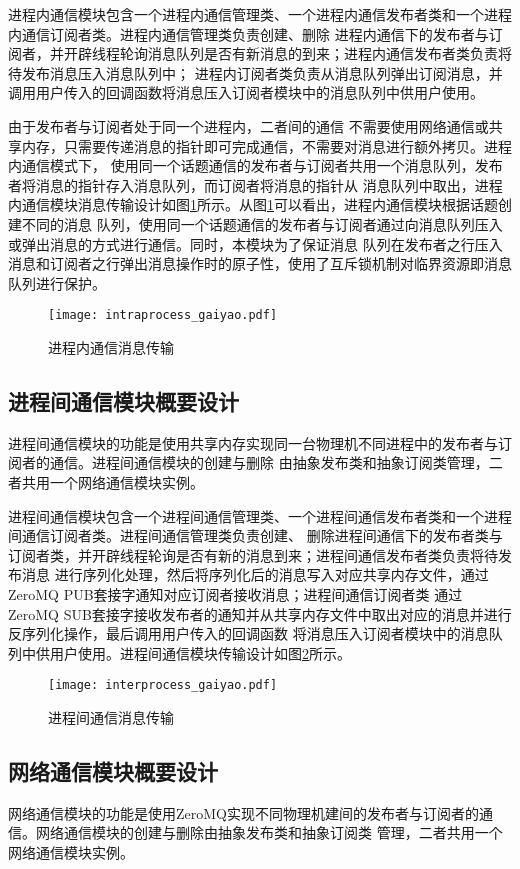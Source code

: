 进程内通信模块包含一个进程内通信管理类、一个进程内通信发布者类和一个进程内通信订阅者类。进程内通信管理类负责创建、删除
进程内通信下的发布者与订阅者，并开辟线程轮询消息队列是否有新消息的到来；进程内通信发布者类负责将待发布消息压入消息队列中；
进程内订阅者类负责从消息队列弹出订阅消息，并调用用户传入的回调函数将消息压入订阅者模块中的消息队列中供用户使用。

由于发布者与订阅者处于同一个进程内，二者间的通信
不需要使用网络通信或共享内存，只需要传递消息的指针即可完成通信，不需要对消息进行额外拷贝。进程内通信模式下，
使用同一个话题通信的发布者与订阅者共用一个消息队列，发布者将消息的指针存入消息队列，而订阅者将消息的指针从
消息队列中取出，进程内通信模块消息传输设计如图\ref{intraprocess_gaiyao}所示。从图\ref{intraprocess_gaiyao}可以看出，进程内通信模块根据话题创建不同的消息
队列，使用同一个话题通信的发布者与订阅者通过向消息队列压入或弹出消息的方式进行通信。同时，本模块为了保证消息
队列在发布者之行压入消息和订阅者之行弹出消息操作时的原子性，使用了互斥锁机制对临界资源即消息队列进行保护。
\begin{figure}[H]
  \centering
  \texttt{[image: intraprocess\_gaiyao.pdf]}
  \caption{进程内通信消息传输}
  \label{intraprocess_gaiyao}
\end{figure}

\subsection{进程间通信模块概要设计}
进程间通信模块的功能是使用共享内存实现同一台物理机不同进程中的发布者与订阅者的通信。进程间通信模块的创建与删除
由抽象发布类和抽象订阅类管理，二者共用一个网络通信模块实例。

进程间通信模块包含一个进程间通信管理类、一个进程间通信发布者类和一个进程间通信订阅者类。进程间通信管理类负责创建、
删除进程间通信下的发布者类与订阅者类，并开辟线程轮询是否有新的消息到来；进程间通信发布者类负责将待发布消息
进行序列化处理，然后将序列化后的消息写入对应共享内存文件，通过ZeroMQ PUB套接字通知对应订阅者接收消息；进程间通信订阅者类
通过ZeroMQ SUB套接字接收发布者的通知并从共享内存文件中取出对应的消息并进行反序列化操作，最后调用用户传入的回调函数
将消息压入订阅者模块中的消息队列中供用户使用。进程间通信模块传输设计如图\ref{interprocess_gaiyao}所示。
\begin{figure}[H]
  \centering
  \texttt{[image: interprocess\_gaiyao.pdf]}
  \caption{进程间通信消息传输}
  \label{interprocess_gaiyao}
\end{figure}

\subsection{网络通信模块概要设计}
网络通信模块的功能是使用ZeroMQ实现不同物理机建间的发布者与订阅者的通信。网络通信模块的创建与删除由抽象发布类和抽象订阅类
管理，二者共用一个网络通信模块实例。

